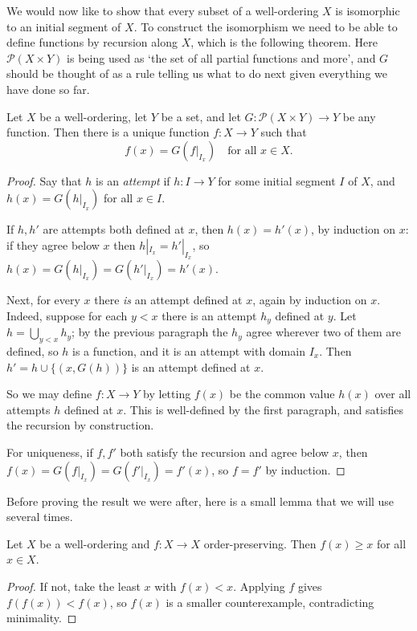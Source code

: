 \documentclass[a4paper]{scrartcl}
\begin{document}
We would now like to show that every subset of a well-ordering $X$ is isomorphic to an initial segment of $X$. To construct the isomorphism we need to be able to define functions by recursion along $X$, which is the following theorem. Here $\mathcal{P}(X \times Y)$ is being used as `the set of all partial functions and more', and $G$ should be thought of as a rule telling us what to do next given everything we have done so far.

\begin{theorem}\label{thm:worecursion}
Let $X$ be a well-ordering, let $Y$ be a set, and let $G: \mathcal{P}(X \times Y) \rightarrow Y$ be any function. Then there is a unique function $f: X \rightarrow Y$ such that
$$f(x) = G\left(\left.f\right|_{I_x}\right) \quad \text{for all } x \in X.$$
\end{theorem}
\begin{proof}
Say that $h$ is an \emph{attempt} if $h : I \rightarrow Y$ for some initial segment $I$ of $X$, and $h(x) = G(h|_{I_x})$ for all $x \in I$.

If $h, h'$ are attempts both defined at $x$, then $h(x) = h'(x)$, by induction on $x$: if they agree below $x$ then $h|_{I_x} = h'|_{I_x}$, so $h(x) = G(h|_{I_x}) = G(h'|_{I_x}) = h'(x)$.

Next, for every $x$ there \emph{is} an attempt defined at $x$, again by induction on $x$. Indeed, suppose for each $y < x$ there is an attempt $h_y$ defined at $y$. Let $h = \bigcup_{y<x} h_y$; by the previous paragraph the $h_y$ agree wherever two of them are defined, so $h$ is a function, and it is an attempt with domain $I_x$. Then $h' = h \cup \{(x, G(h))\}$ is an attempt defined at $x$.

So we may define $f: X \to Y$ by letting $f(x)$ be the common value $h(x)$ over all attempts $h$ defined at $x$. This is well-defined by the first paragraph, and satisfies the recursion by construction.

For uniqueness, if $f, f'$ both satisfy the recursion and agree below $x$, then $f(x) = G(f|_{I_x}) = G(f'|_{I_x}) = f'(x)$, so $f = f'$ by induction.
\end{proof}

Before proving the result we were after, here is a small lemma that we will use several times.

\begin{lemma}\label{lem:orderpreservingup}
  Let $X$ be a well-ordering and $f: X \to X$ order-preserving. Then $f(x) \geq x$ for all $x \in X$.
\end{lemma}
\begin{proof}
  If not, take the least $x$ with $f(x) < x$. Applying $f$ gives $f(f(x)) < f(x)$, so $f(x)$ is a smaller counterexample, contradicting minimality.
\end{proof}
\end{document}
